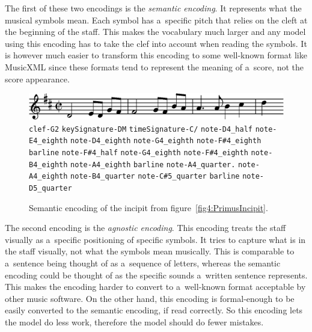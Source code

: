 The first of these two encodings is the \emph{semantic encoding}. It represents what the musical symbols mean. Each symbol has a~specific pitch that relies on the cleft at the beginning of the staff. This makes the vocabulary much larger and any model using this encoding has to take the clef into account when reading the symbols. It is however much easier to transform this encoding to some well-known format like MusicXML since these formats tend to represent the meaning of a~score, not the score appearance.

\begin{figure}[h]
    \centering
    \includegraphics[width=140mm]{../img/primus-incipit}
    \verb`clef-G2`
    \quad\verb`keySignature-DM`
    \quad\verb`timeSignature-C/`
    \quad\verb`note-D4_half`
    \quad\verb`note-E4_eighth`
    \quad\verb`note-D4_eighth`
    \quad\verb`note-G4_eighth`
    \quad\verb`note-F#4_eighth`
    \quad\verb`barline`
    \quad\verb`note-F#4_half`
    \quad\verb`note-G4_eighth`
    \quad\verb`note-F#4_eighth`
    \quad\verb`note-B4_eighth`
    \quad\verb`note-A4_eighth`
    \quad\verb`barline`
    \quad\verb`note-A4_quarter.`
    \quad\verb`note-A4_eighth`
    \quad\verb`note-B4_quarter`
    \quad\verb`note-C#5_quarter`
    \quad\verb`barline`
    \quad\verb`note-D5_quarter`
    \caption{Semantic encoding of the incipit from figure~\ref{fig4:PrimusIncipit}.}
    \label{fig4:PrimusIncipitSemanticEncoded}
\end{figure}

The second encoding is the \emph{agnostic encoding}. This encoding treats the staff visually as a~specific positioning of specific symbols. It tries to capture what is in the staff visually, not what the symbols mean musically. This is comparable to a~sentence being thought of as a~sequence of letters, whereas the semantic encoding could be thought of as the specific sounds a~written sentence represents. This makes the encoding harder to convert to a~well-known format acceptable by other music software. On the other hand, this encoding is formal-enough to be easily converted to the semantic encoding, if read correctly. So this encoding lets the model do less work, therefore the model should do fewer mistakes.

